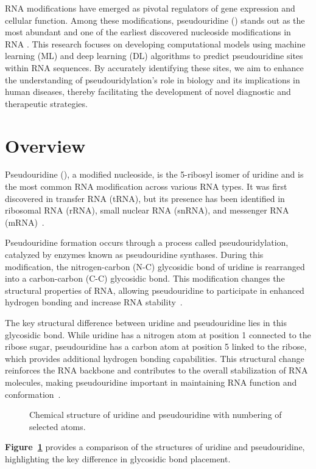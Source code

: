 RNA modifications have emerged as pivotal regulators of gene expression and cellular function.
Among these modifications, pseudouridine (\pseudo) stands out as the most abundant and one of the earliest discovered nucleoside modifications in RNA \cite{charette_pseudouridine_2000}.
This research focuses on developing computational models using machine learning (ML) and deep learning (DL) algorithms to predict pseudouridine sites within RNA sequences.
By accurately identifying these sites, we aim to enhance the understanding of pseudouridylation's role in biology and its implications in human diseases, thereby facilitating the development of novel diagnostic and therapeutic strategies.


\section{Overview}\label{sec:overview}
  Pseudouridine (\pseudo), a modified nucleoside, is the 5-ribosyl isomer of uridine and is the most common RNA modification across various RNA types.
  It was first discovered in transfer RNA (tRNA), but its presence has been identified in ribosomal RNA (rRNA), small nuclear RNA (snRNA), and messenger RNA (mRNA)~\cite{cohn_nucleoside-5-phosphates_1951}.

  Pseudouridine formation occurs through a process called pseudouridylation, catalyzed by enzymes known as pseudouridine synthases.
  During this modification, the nitrogen-carbon (N-C) glycosidic bond of uridine is rearranged into a carbon-carbon (C-C) glycosidic bond.
  This modification changes the structural properties of RNA, allowing pseudouridine to participate in enhanced hydrogen bonding and increase RNA stability~\cite{charette_pseudouridine_2000}.

  The key structural difference between uridine and pseudouridine lies in this glycosidic bond.
  While uridine has a nitrogen atom at position 1 connected to the ribose sugar, pseudouridine has a carbon atom at position 5 linked to the ribose, which provides additional hydrogen bonding capabilities.
  This structural change reinforces the RNA backbone and contributes to the overall stabilization of RNA molecules, making pseudouridine important in maintaining RNA function and conformation~\cite{ge_rna_2013}.

  \begin{figure}[h!]
    \centering


    \caption{Chemical structure of uridine and pseudouridine with numbering of selected atoms.}
    \label{fig:structure-pseudouridine}
  \end{figure}

  \textbf{Figure~\ref{fig:structure-pseudouridine}} provides a comparison of the structures of uridine and pseudouridine, highlighting the key difference in glycosidic bond placement.

